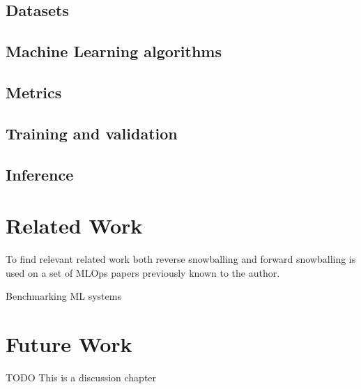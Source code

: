 \subsection{Datasets}
\subsection{Machine Learning algorithms}
\subsection{Metrics}
\subsection{Training and validation}
\subsection{Inference}


\section{Related Work}

To find relevant related work both reverse snowballing and forward snowballing is used on a set of MLOps papers previously known to the author.

Benchmarking ML systems \parencite{cardososilvaBenchmarkingMachineLearning2020}

\section{Future Work}
TODO This is a discussion chapter